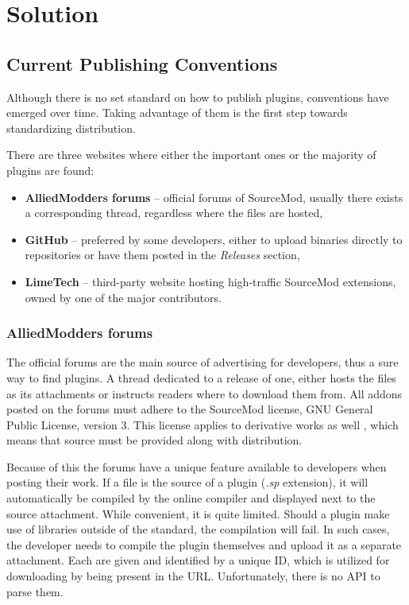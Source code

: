 \chapter{Solution}

\section{Current Publishing Conventions}

Although there is no set standard on how to publish plugins, conventions have emerged over time.
Taking advantage of them is the first step towards standardizing distribution.

There are three websites where either the important ones or the majority of plugins are found:
\begin{itemize}
    \item \textbf{AlliedModders forums} -- official forums of SourceMod, usually there exists a corresponding thread, regardless where the files are hosted,
    \item \textbf{GitHub} -- preferred by some developers, either to upload binaries directly to repositories or have them posted in the \textit{Releases} section,
    \item \textbf{LimeTech} -- third-party website hosting high-traffic SourceMod extensions, owned by one of the major contributors.
\end{itemize}

\subsection{AlliedModders forums}

The official forums are the main source of advertising for developers, thus a sure way to find plugins.
A thread dedicated to a release of one, either hosts the files as its attachments or instructs readers where to download them from.
All addons posted on the forums must adhere to the SourceMod license, GNU General Public License, version 3.
This license applies to derivative works as well \cite{sourcemod-license}, which means that source must be provided along with distribution.

Because of this the forums have a unique feature available to developers when posting their work.
If a file is the source of a plugin (\textit{.sp} extension), it will automatically be compiled by the online compiler and displayed next to the source attachment.
While convenient, it is quite limited.
Should a plugin make use of libraries outside of the standard, the compilation will fail.
In such cases, the developer needs to compile the plugin themselves and upload it as a separate attachment.
Each are given and identified by a unique ID, which is utilized for downloading by being present in the URL.
Unfortunately, there is no API to parse them.

